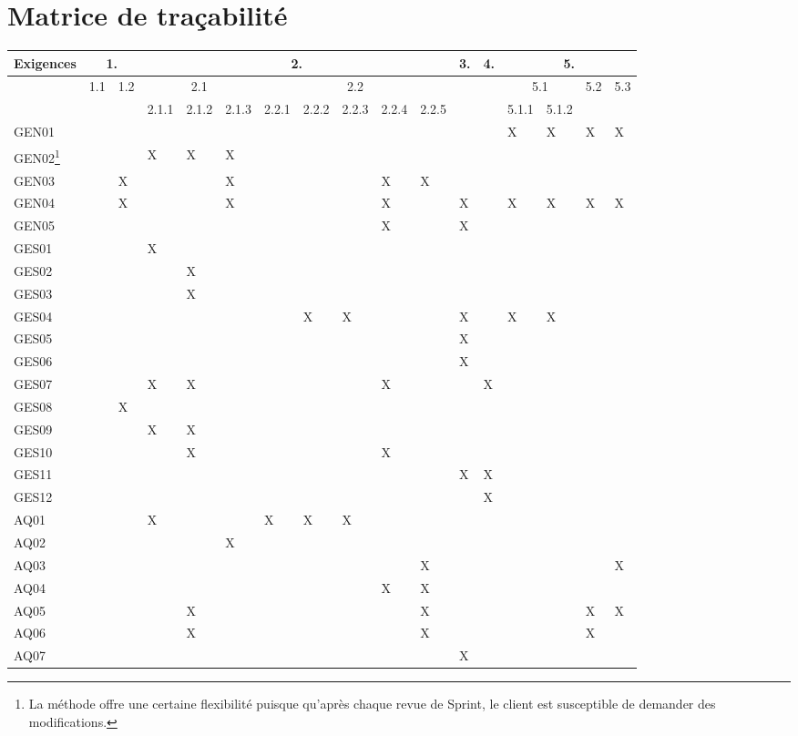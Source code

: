 \chapter{Matrice de traçabilité}
\begin{tabular}{|p{}|p{0.62cm}|p{0.62cm}|p{0.62cm}|p{0.62cm}|p{0.62cm}|p{0.62cm}|p{0.62cm}|p{0.62cm}|p{0.62cm}|p{0.62cm}|p{0.62cm}|p{0.62cm}|p{0.62cm}|p{0.62cm}|p{0.62cm}|p{0.62cm}|}
\hline
	Exigences & \multicolumn{2}{c|}{1.} & \multicolumn{8}{c|}{2.} & 3. & 4. & \multicolumn{4}{c|}{5.} \\ 
\hline
	& 1.1 & 1.2 & \multicolumn{3}{c|}{2.1} & \multicolumn{5}{c|}{2.2} & & & \multicolumn{2}{c|}{5.1} & 5.2 & 5.3 \\
\hline
	& & & 2.1.1 & 2.1.2 & 2.1.3 & 2.2.1 & 2.2.2 & 2.2.3 & 2.2.4 & 2.2.5 & & & 5.1.1 & 5.1.2 & & \\
\hline  
	GEN01 & & & & & & & & & & & & & X & X & X & X \\
\hline  
	GEN02\footnote{La méthode \key{Scrum} offre une certaine flexibilité puisque qu’après chaque revue de Sprint, le client est susceptible de demander des modifications.} & & & X & X & X & & & & & & & & & & & \\
\hline  
	GEN03 & & X & & & X & & & & X & X & & & & & & \\
\hline  
	GEN04 & & X & & & X & & & & X & & X & & X & X & X & X \\
\hline  
	GEN05 & & & & & & & & & X & & X & & & & & \\
\hline  
	GES01 & & & X & & & & & & & & & & & & & \\
\hline  
	GES02 & & & & X & & & & & & & & & & & & \\
\hline  
	GES03 & & & & X & & & & & & & & & & & & \\
\hline  
	GES04 & & & & & & & X & X & & & X & & X & X & & \\
\hline  
	GES05 & & & & & & & & & & & X & & & & & \\
\hline  
	GES06 & & & & & & & & & & & X & & & & & \\
\hline  
	GES07 & & & X & X & & & & & X & & & X & & & & \\
\hline  
	GES08 & & X & & & & & & & & & & & & & & \\
\hline  
	GES09 & & & X & X & & & & & & & & & & & & \\
\hline  
	GES10 & & & & X & & & & & X & & & & & & & \\
\hline  
	GES11 & & & & & & & & & & & X & X & & & & \\
\hline  
	GES12 & & & & & & & & & & & & X & & & & \\
\hline  
	AQ01 & & & X & & & X & X & X & & & & & & & & \\
\hline  
	AQ02 & & & & & X & & & & & & & & & & & \\
\hline  
	AQ03 & & & & & & & & & & X & & & & & & X\\	
\hline  
	AQ04 & & & & & & & & & X & X & & & & & & \\	
\hline  
	AQ05 & & & & X & & & & & & X & & & & & X & X\\	
\hline  
	AQ06 & & & & X & & & & & & X & & & & & X & \\	
\hline  
	AQ07 & & & & & & & & & & & X & & & & & \\								


\end{tabular}
